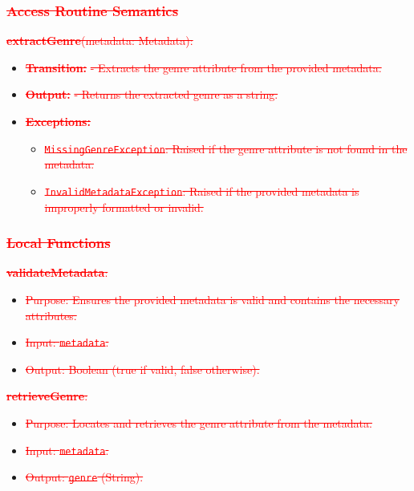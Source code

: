 \documentclass[12pt, titlepage]{article}
\begin{document}
\subsubsection{\textcolor{red}{\sout{Access Routine Semantics}}}

\noindent \textcolor{red}{\sout{\textbf{extractGenre}(metadata: Metadata):}}
\begin{itemize}
\item \textcolor{red}{\sout{\textbf{Transition:}}}
    \textcolor{red}{\sout{- Extracts the genre attribute from the provided metadata.}}
\item \textcolor{red}{\sout{\textbf{Output:}}}
    \textcolor{red}{\sout{- Returns the extracted genre as a string.}}
\item \textcolor{red}{\sout{\textbf{Exceptions:}}}
    \begin{itemize}
    \item \textcolor{red}{\sout{\texttt{MissingGenreException}: Raised if the genre attribute is not found in the metadata.}}
    \item \textcolor{red}{\sout{\texttt{InvalidMetadataException}: Raised if the provided metadata is improperly formatted or invalid.}}
    \end{itemize}
\end{itemize}

\subsubsection{\textcolor{red}{\sout{Local Functions}}}

\textcolor{red}{\sout{\textbf{validateMetadata}:}}
\begin{itemize}
\item \textcolor{red}{\sout{Purpose: Ensures the provided metadata is valid and contains the necessary attributes.}}
\item \textcolor{red}{\sout{Input: \texttt{metadata}.}}
\item \textcolor{red}{\sout{Output: Boolean (true if valid, false otherwise).}}
\end{itemize}

\textcolor{red}{\sout{\textbf{retrieveGenre}:}}
\begin{itemize}
\item \textcolor{red}{\sout{Purpose: Locates and retrieves the genre attribute from the metadata.}}
\item \textcolor{red}{\sout{Input: \texttt{metadata}.}}
\item \textcolor{red}{\sout{Output: \texttt{genre} (String).}}
\end{itemize}
\end{document}
